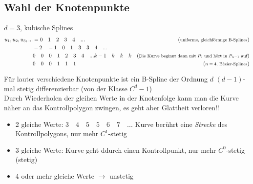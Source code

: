 \subsection{Wahl der Knotenpunkte}
$d = 3$, kubische Splines
\begin{align*}
 u_1, u_2, u_3, ... &= 0\quad1\quad2\quad3\quad4\quad... & (\text{\footnotesize uniforme, gleichförmige B-Splines})\\
		& -2\quad-1\quad0\quad1\quad3\quad3\quad4\quad...\\
		& 0\quad0\quad0\quad1\quad2\quad3\quad4\quad...k-1\quad k\quad k \quad k &
			(\text{\footnotesize Die Kurve beginnt dann mit $P_9$ und hört in $P_{n-1}$ auf})\\
		& 0\quad0\quad0\quad1\quad1\quad1 &(\text{\footnotesize $n=4$, Bézier-Splines})
\end{align*}
\begin{center}
\end{center}
Für lauter verschiedene Knotenpunkte ist ein B-Spline der Ordnung $d$ $(d-1)$-mal stetig differenzierbar (von der
Klasse $C^d-1$)\\[1em]
Durch Wiederholen der gleihen Werte in der Knotenfolge kann man die Kurve näher an das Kontrollpolygon zwingen,
es geht aber Glattheit verloren!!
\begin{itemize}
 \item 2 gleiche Werte: $3 \quad 4 \quad 5 \quad 5 \quad 6 \quad 7 \quad ...$ Kurve berührt eine \emph{Strecke} des
	Kontrollpolygons, nur mehr $C^1$-stetig
	\begin{center}
	\end{center}
 \item 3 gleiche Werte: Kurve geht ddurch einen Kontrollpunkt, nur mehr $C^0$-stetig (stetig)
 \item 4 oder mehr gleiche Werte $\rightarrow$ unstetig
\end{itemize}